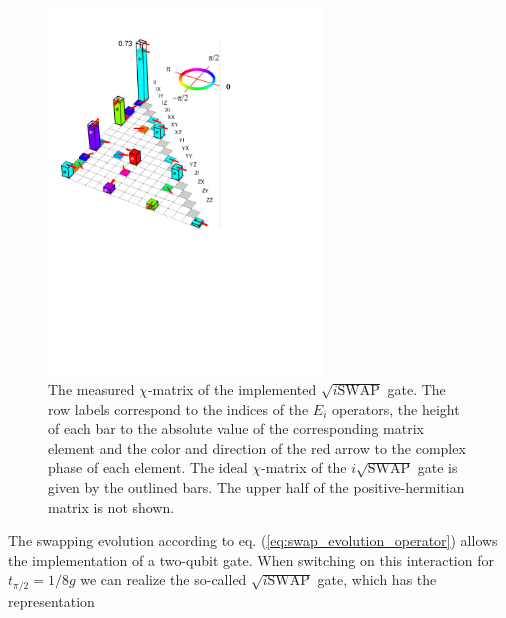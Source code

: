 \begin{figure}
		\includegraphics[width=0.65\textwidth]{./material/papers/iswap/figures/chi_matrix}
	\caption[Measured $\chi$-matrix of the $\sqrt{i\textrm{SWAP}}$ gate]{The measured $\chi$-matrix of the implemented $\sqrt{i\mathrm{SWAP}}$ gate. The row labels correspond to the indices of the $E_i$ operators, the height of each bar to the absolute value of the corresponding matrix element and the color and direction of the red arrow to the complex phase of each element. The ideal $\chi$-matrix of the $i\sqrt{\mathrm{SWAP}}$ gate is given by the outlined bars. The upper half of the positive-hermitian matrix is not shown.}
	\label{fig:gate_chi_matrix_and_errors}
\end{figure}

The swapping evolution according to eq. (\ref{eq:swap_evolution_operator}) allows the implementation of a two-qubit gate. When switching on this interaction for $t_{\pi/2} = 1/8g$ we can realize the so-called $\sqrt{i\mathrm{SWAP}}$ gate, which has the representation

